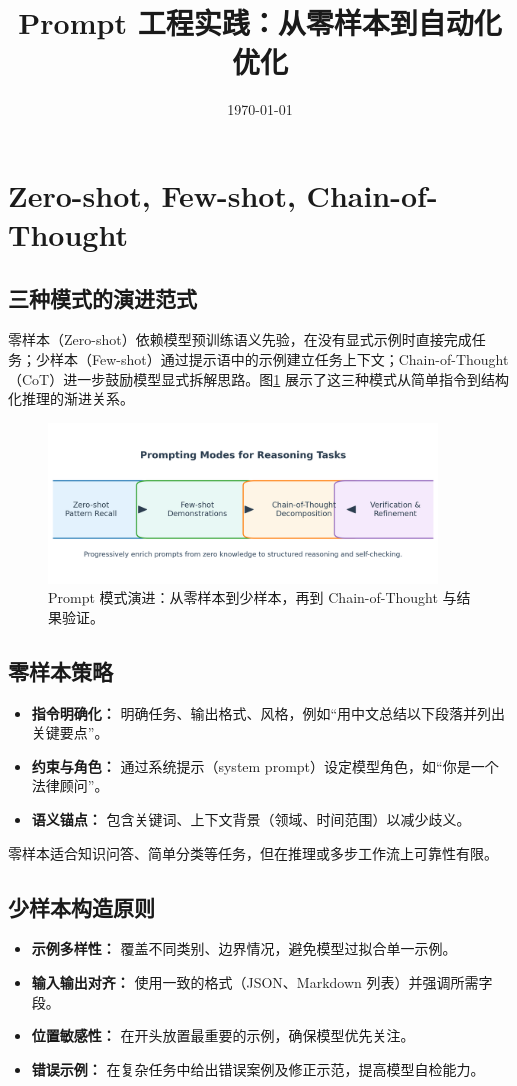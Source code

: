 \documentclass[UTF8,zihao=-4]{ctexart}
\title{Prompt 工程实践：从零样本到自动化优化}
\author{}
\date{\today}
\begin{document}
\maketitle

\section{Zero-shot, Few-shot, Chain-of-Thought}
\subsection{三种模式的演进范式}
零样本（Zero-shot）依赖模型预训练语义先验，在没有显式示例时直接完成任务；少样本（Few-shot）通过提示语中的示例建立任务上下文；Chain-of-Thought（CoT）进一步鼓励模型显式拆解思路。图\ref{fig:prompt_modes_cn} 展示了这三种模式从简单指令到结构化推理的渐进关系。
\begin{figure}[H]
  \centering
  \includegraphics[width=0.92\textwidth]{prompt_modes.png}
  \caption{Prompt 模式演进：从零样本到少样本，再到 Chain-of-Thought 与结果验证。}
  \label{fig:prompt_modes_cn}
\end{figure}

\subsection{零样本策略}
\begin{itemize}
  \item \textbf{指令明确化：} 明确任务、输出格式、风格，例如“用中文总结以下段落并列出关键要点”。
  \item \textbf{约束与角色：} 通过系统提示（system prompt）设定模型角色，如“你是一个法律顾问”。
  \item \textbf{语义锚点：} 包含关键词、上下文背景（领域、时间范围）以减少歧义。
\end{itemize}
零样本适合知识问答、简单分类等任务，但在推理或多步工作流上可靠性有限。

\subsection{少样本构造原则}
\begin{itemize}
  \item \textbf{示例多样性：} 覆盖不同类别、边界情况，避免模型过拟合单一示例。
  \item \textbf{输入输出对齐：} 使用一致的格式（JSON、Markdown 列表）并强调所需字段。
  \item \textbf{位置敏感性：} 在开头放置最重要的示例，确保模型优先关注。
  \item \textbf{错误示例：} 在复杂任务中给出错误案例及修正示范，提高模型自检能力。
\end{itemize}
\end{document}
